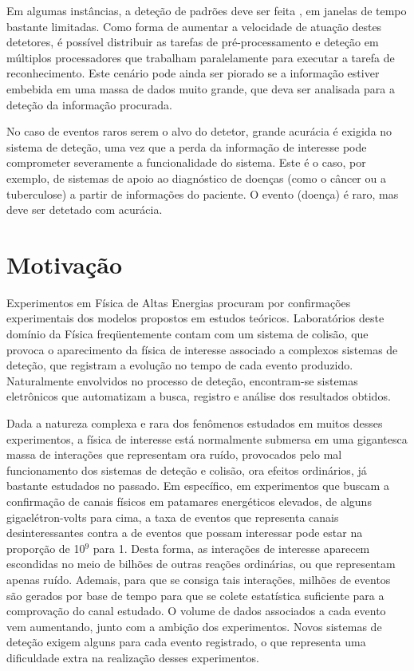 Em algumas instâncias, a deteção de padrões deve ser feita , em
janelas de tempo bastante limitadas. Como forma de aumentar a velocidade de
atuação destes detetores, é possível distribuir as tarefas de
pré-processamento e deteção em múltiplos processadores que trabalham
paralelamente para executar a tarefa de reconhecimento. Este cenário pode
ainda ser piorado se a informação estiver embebida em uma massa de dados muito
grande, que deva ser analisada para a deteção da informação procurada.

No caso de eventos raros serem o alvo do detetor, grande acurácia é exigida no
sistema de deteção, uma vez que a perda da informação de interesse pode
comprometer severamente a funcionalidade do sistema. Este é o caso, por
exemplo, de sistemas de apoio ao diagnóstico de doenças (como o câncer ou a
tuberculose) a partir de informações do paciente. O evento (doença) é raro,
mas deve ser detetado com acurácia.

\section{Motivação}

Experimentos em Física de Altas Energias procuram por confirmações
experimentais dos modelos propostos em estudos teóricos. Laboratórios deste
domínio da Física freqüentemente contam com um sistema de colisão, que provoca
o aparecimento da física de interesse associado a complexos sistemas de
deteção, que registram a evolução no tempo de cada evento
produzido. Naturalmente envolvidos no processo de deteção, encontram-se
sistemas eletrônicos que automatizam a busca, registro e análise dos
resultados obtidos.

Dada a natureza complexa e rara dos fenômenos estudados em muitos desses
experimentos, a física de interesse está normalmente submersa em uma
gigantesca massa de interações que representam ora ruído, provocados pelo mal
funcionamento dos sistemas de deteção e colisão, ora efeitos ordinários, já
bastante estudados no passado. Em específico, em experimentos que buscam a
confirmação de canais físicos em patamares energéticos elevados, de alguns
gigaelétron-volts para cima, a taxa de eventos que representa canais
desinteressantes contra a de eventos que possam interessar pode estar na
proporção de 10$^9$ para 1. Desta forma, as interações de interesse aparecem
escondidas no meio de bilhões de outras reações ordinárias, ou que representam
apenas ruído. Ademais, para que se consiga tais interações, milhões de eventos
são gerados por base de tempo para que se colete estatística suficiente para a
comprovação do canal estudado. O volume de dados associados a cada evento vem
aumentando, junto com a ambição dos experimentos. Novos sistemas de deteção
exigem alguns  para cada evento registrado, o que representa
uma dificuldade extra na realização desses experimentos.

